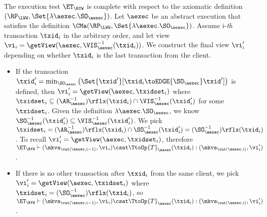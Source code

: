 The execution test $\ET_{\RYW}$ is complete with respect to 
the axiomatic definition $(\RP_{\LWW}, \Set{\lambda \aexec.\SO_{\aexec} })$. 
Let $\aexec$ be an abstract execution that satisfies the definition
$\CMa(\RP_{\LWW}, \Set{\lambda \aexec.\SO_{\aexec} })$.
Assume i-\emph{th} transaction \( \txid_i \) in the arbitrary order,
and let view \( \vi_{i} = \getView(\aexec, \VIS^{-1}_{\aexec}(\txid_{i}) ) \).
We construct the final view \( \vi'_i\) depending on whether \( \txid_i \) is the last transaction from the client.
\begin{itemize}
\item If the transaction \( \txid'_i = \min_{\SO_\aexec}\left(\Set{\txid'}[\txid_i \toEDGE{\SO_\aexec} \txid' ] \right) \)  is defined,
then \( \vi'_i = \getView(\aexec, \txidset_i) \) where \( \txidset_i \subseteq (\AR_{\aexec}^{-1})\rflx(\txid_i) \cap \VIS_\aexec^{-1}(\txid'_i) \) for some \( \txidset_i \).
Given the definition \( \lambda \aexec.\SO_{\aexec} \), 
we know \( \SO_\aexec^{-1}(\txid'_i) \subseteq \VIS_\aexec^{-1}(\txid'_i) \).
We pick \( \txidset_i = (\AR_\aexec^{-1})\rflx(\txid_i) \cap \SO_\aexec^{-1}(\txid'_i) = (\SO_\aexec^{-1})\rflx(\txid_i) \).
To recall \( \vi'_i = \getView(\aexec, \txidset_i) \), therefore \( \ET_\RYW \vdash (\mkvs_{\cut(\aexec, i-1)}, \vi_i) \csat \TtoOp{T}_{\aexec}(\txid_{i}) : (\mkvs_{\cut(\aexec, i)}, \vi'_{i}) \).
\item If there is no other transaction after \( \txid_i \) from the same client,
we pick \( \vi'_i = \getView(\aexec, \txidset_i) \) where \( \txidset_i = (\SO_\aexec^{-1})\rflx(\txid_i) \),
so \( \ET_\RYW \vdash (\mkvs_{\cut(\aexec, i-1)}, \vi_i) \csat \TtoOp{T}_{\aexec}(\txid_{i}) : (\mkvs_{\cut(\aexec, i)}, \vi'_{i}) \).
\end{itemize}

